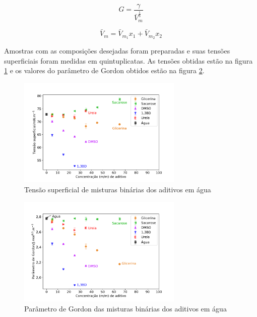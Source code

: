 		\begin{equation}
			G = \dfrac{\gamma}{\bar{V}_m^{\frac{1}{3}}}
			\label{eqn:Gordon}
		\end{equation}
		
		\begin{equation}
			\bar{V}_m = \bar{V}_{m_{1}}x_1 + \bar{V}_{m_{2}}x_2
			\label{eqn:volume_molar_médio}
		\end{equation}
		
		Amostras com as composições desejadas foram preparadas e suas tensões superficiais foram medidas em quintuplicatas. As tensões obtidas estão na figura \ref{fig:tensao_superficial_por_conc} e os valores do parâmetro de Gordon obtidos estão na figura \ref{fig:param_gordon_por_conc}.
		
		\begin{figure}[h]
			\centering
			\includegraphics[width=0.7\textwidth]{imagens/propriedades/tensao_superficial}
			\caption{Tensão superficial de misturas binárias dos aditivos em água}
			\label{fig:tensao_superficial_por_conc}
		\end{figure}
		
		\begin{figure}[h]
			\centering
			\includegraphics[width=0.7\textwidth]{imagens/propriedades/param_gordon}
			\caption{Parâmetro de Gordon das misturas binárias dos aditivos em água}
			\label{fig:param_gordon_por_conc}
		\end{figure}
		
